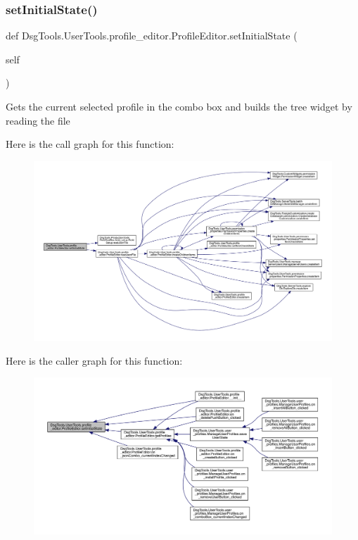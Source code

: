 \subsubsection{\texorpdfstring{set\+Initial\+State()}{setInitialState()}}
{\footnotesize\ttfamily def Dsg\+Tools.\+User\+Tools.\+profile\+\_\+editor.\+Profile\+Editor.\+set\+Initial\+State (\begin{DoxyParamCaption}\item[{}]{self }\end{DoxyParamCaption})}

\begin{DoxyVerb}Gets the current selected profile in the combo box and builds the tree widget by reading the file
\end{DoxyVerb}
 Here is the call graph for this function\+:
\nopagebreak
\begin{figure}[H]
\begin{center}
\leavevmode
\includegraphics[width=350pt]{class_dsg_tools_1_1_user_tools_1_1profile__editor_1_1_profile_editor_aca19b2e056761a396c13ad60233397c7_cgraph}
\end{center}
\end{figure}
Here is the caller graph for this function\+:
\nopagebreak
\begin{figure}[H]
\begin{center}
\leavevmode
\includegraphics[width=350pt]{class_dsg_tools_1_1_user_tools_1_1profile__editor_1_1_profile_editor_aca19b2e056761a396c13ad60233397c7_icgraph}
\end{center}
\end{figure}
